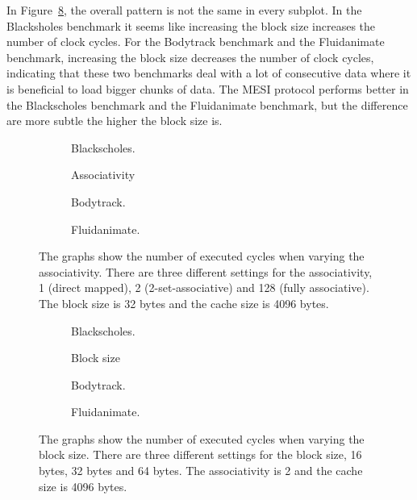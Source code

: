 In Figure~\ref{fig:block_size}, the overall pattern is not the same in every subplot.
In the Blacksholes benchmark it seems like increasing the block size increases the
number of clock cycles. For the Bodytrack benchmark and  the Fluidanimate benchmark,
increasing the block size decreases the number of clock cycles, indicating that these
two benchmarks deal with a lot of consecutive data where it is beneficial to load bigger
chunks of data. The MESI protocol performs better in the Blackscholes benchmark and the
Fluidanimate benchmark, but the difference are more subtle the higher the block size is.

\begin{figure}[H]
    \centering
    \begin{subfigure}[b]{0.33\textwidth}
        \centering
        \caption{Blackscholes.}\label{fig:associativity_blackscholes}
    \end{subfigure}%
    \hfill
    \begin{subfigure}[b]{0.33\textwidth}
        \centering
        Associativity\par\medskip
        \caption{Bodytrack.}\label{fig:associativity_bodytrack}
    \end{subfigure}%
    \hfill
    \begin{subfigure}[b]{0.33\textwidth}
        \centering
        \caption{Fluidanimate.}\label{fig:associativity_fluidanimate}
    \end{subfigure}
    \hfill
    \caption{The graphs show the number of executed cycles when varying the associativity. There are three different settings for the associativity, 1 (direct mapped), 2 (2-set-associative) and 128 (fully associative). The block size is 32 bytes and the cache size is 4096 bytes.}\label{fig:associativity}
\end{figure}

\begin{figure}[H]
    \centering
    \begin{subfigure}[b]{0.33\textwidth}
        \centering
        \caption{Blackscholes.}\label{fig:block_size_blackscholes}
    \end{subfigure}%
    \hfill
    \begin{subfigure}[b]{0.33\textwidth}
        \centering
        Block size\par\medskip
        \caption{Bodytrack.}\label{fig:block_size_bodytrack}
    \end{subfigure}%
    \hfill
    \begin{subfigure}[b]{0.33\textwidth}
        \centering
        \caption{Fluidanimate.}\label{fig:block_size_fluidanimate}
    \end{subfigure}
    \hfill
    \caption{The graphs show the number of executed cycles when varying the block size. There are three different settings for the block size, 16 bytes, 32 bytes and 64 bytes. The associativity is 2 and the cache size is 4096 bytes.}\label{fig:block_size}
\end{figure}

